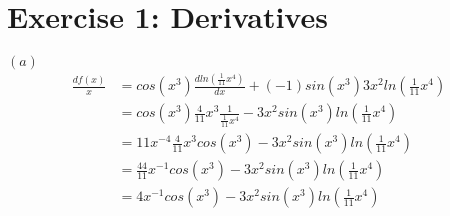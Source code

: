\documentclass{article}
\begin{document}
\section{Exercise 1: Derivatives}
$(a)$\\
\begin{align*} 
    \frac{df(x)}{x} &= cos(x^3)\frac{dln(\frac{1}{11}x^4)}{dx} + (-1)sin(x^3)3x^2ln(\frac{1}{11}x^4)\\
    &=cos(x^3)\frac{4}{11}x^3\frac{1}{\frac{1}{11}x^4}-3x^2sin(x^3)ln(\frac{1}{11}x^4)\\
    &=11x^{-4}\frac{4}{11}x^3cos(x^3) - 3x^2sin(x^3)ln(\frac{1}{11}x^4)\\
    &=\frac{44}{11}x^{-1}cos(x^3)-3x^2sin(x^3)ln(\frac{1}{11}x^4)\\
    &=4x^{-1}cos(x^3)-3x^2sin(x^3)ln(\frac{1}{11}x^4)
\end{align*}
\end{document}
